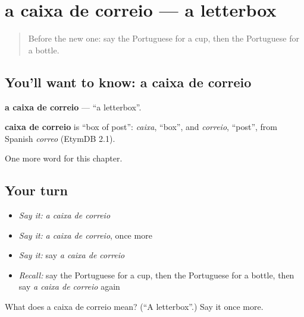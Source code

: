 \section[a caixa de correio]{a caixa de correio — a letterbox}

\label{lesson:PT-C99-caixa-de-correio}



\begin{quote}
Before the new one: say the Portuguese for a cup, then the Portuguese for a bottle.
\end{quote}

\subsection*{You'll want to know: a caixa de correio}
\textbf{a caixa de correio} — \textquotedblleft{}a letterbox\textquotedblright{}.

\begin{cousinweb}
\textbf{caixa de correio} is \textquotedblleft{}box of post\textquotedblright{}: \emph{caixa}, \textquotedblleft{}box\textquotedblright{}, and \emph{correio}, \textquotedblleft{}post\textquotedblright{}, from Spanish \emph{correo} (EtymDB 2.1).
\end{cousinweb}

\begin{grammarlens}[title={What you've built}]
One more word for this chapter.
\end{grammarlens}

\subsection*{Your turn}
\begin{itemize}
\raggedright
  \item \emph{Say it:} \emph{a caixa de correio}
  \item \emph{Say it:} \emph{a caixa de correio}, once more
  \item \emph{Say it:} say \emph{a caixa de correio}
  \item \emph{Recall:} say the Portuguese for a cup, then the Portuguese for a bottle, then say \emph{a caixa de correio} again
\end{itemize}

\begin{tcolorbox}[breakable,colback=teal!4,colframe=teal!35!black,title={Before you move on}]
What does a caixa de correio mean? (\textquotedblleft{}A letterbox\textquotedblright{}.) Say it once more.
\end{tcolorbox}
